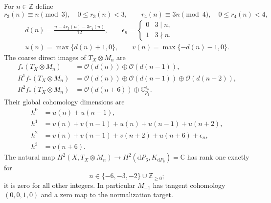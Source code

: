 \begin{theorem}\label{cdp:C5b}
For $n\in\mathbb Z$ define
\[
 r_3(n)\equiv n\pmod3,\quad 0\le r_3(n)<3,
 \qquad r_4(n)\equiv3n\pmod4,\quad0\le r_4(n)<4,
\]
\begin{gather*}
 d(n)=\frac{n-4r_3(n)-3r_4(n)}{12},\qquad
 \epsilon_n=\begin{cases}0&3\mid n,\\1&3\nmid n.\end{cases}
\\
 u(n)=\max\{d(n)+1,0\},\qquad
 v(n)=\max\{-d(n)-1,0\}.
\end{gather*}
The coarse direct images of $T_X\otimes M_n$ are
\begin{align*}
 f_*(T_X\otimes M_n)&=\mathcal O(d(n))\oplus\mathcal O(d(n-1)),\\
 R^1f_*(T_X\otimes M_n)&=\mathcal O(d(n))\oplus\mathcal O(d(n-1))\oplus\mathcal O(d(n+2)),\\
 R^2f_*(T_X\otimes M_n)&=\mathcal O(d(n+6))\oplus\mathbb C_{p_1}^{\epsilon_n}.\tag{C.5}
\end{align*}
Their global cohomology dimensions are
\begin{align*}
 h^0&=u(n)+u(n-1),\\
 h^1&=v(n)+v(n-1)+u(n)+u(n-1)+u(n+2),\\
 h^2&=v(n)+v(n-1)+v(n+2)+u(n+6)+\epsilon_n,\\
 h^3&=v(n+6).                                             \tag{C.6}
\end{align*}
The natural map $H^2(X,T_X\otimes M_n)\to H^2(\mathrm dP_6,K_{\mathrm dP_6})=\mathbb C$ has rank one exactly for
\[
 n\in\{-6,-3,-2\}\cup\mathbb Z_{\ge0};                         \tag{C.7}
\]
it is zero for all other integers. In particular $M_{-1}$ has tangent cohomology $(0,0,1,0)$ and a zero map to the normalization target.
\end{theorem}

